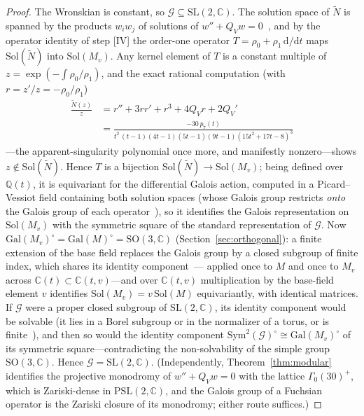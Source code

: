 \documentclass[11pt]{article}
\newcommand{\rmd}{\mathrm{d}}
\theoremstyle{plain}
\theoremstyle{remark}
\begin{document}
\begin{proof}
The Wronskian is constant, so $\mathcal{G}\subseteq\mathrm{SL}(2,\mathbb{C})$.
The solution space of $\widetilde N$ is spanned by the products $w_iw_j$ of solutions of
$w''+Q_Vw=0$~\cite{vdPutSinger}, and by the operator identity of step [IV] the order-one
operator $T=\rho_0+\rho_1\,\rmd/\rmd t$ maps $\mathrm{Sol}(\widetilde N)$ into
$\mathrm{Sol}(M_v)$. Any kernel element of $T$ is a constant multiple of
$z=\exp(-\!\int\!\rho_0/\rho_1)$, and the exact rational computation (with
$r=z'/z=-\rho_0/\rho_1$)
\begin{equation}
\begin{split}
\frac{\widetilde N(z)}{z}&=r''+3rr'+r^3+4Q_Vr+2Q_V'\\[2pt]
&=\frac{-30\,p_7(t)}{t^2\,(t-1)(4t-1)(5t-1)(9t-1)(15t^2+17t-8)^3}
\end{split}
\label{eq:Einj}
\end{equation}
---the apparent-singularity polynomial once more, and manifestly nonzero---shows
$z\notin\mathrm{Sol}(\widetilde N)$. Hence $T$ is a bijection
$\mathrm{Sol}(\widetilde N)\to\mathrm{Sol}(M_v)$; being defined over $\mathbb{Q}(t)$, it is
equivariant for the differential Galois action, computed in a Picard--Vessiot field containing
both solution spaces (whose Galois group restricts \emph{onto} the Galois group of each
operator~\cite{vdPutSinger}), so it identifies the Galois representation on
$\mathrm{Sol}(M_v)$ with the symmetric square of the standard representation of $\mathcal{G}$.
Now $\mathrm{Gal}(M_v)^\circ=\mathrm{Gal}(M)^\circ=\mathrm{SO}(3,\mathbb{C})$
(Section~\ref{sec:orthogonal}): a finite extension of the base field replaces the Galois group by
a closed subgroup of finite index, which shares its identity component~\cite{vdPutSinger}---
applied once to $M$ and once to $M_v$ across $\mathbb{C}(t)\subset\mathbb{C}(t,v)$---and over
$\mathbb{C}(t,v)$ multiplication by the base-field element $v$ identifies
$\mathrm{Sol}(M_v)=v\,\mathrm{Sol}(M)$ equivariantly, with identical matrices. If $\mathcal{G}$ were a
proper closed subgroup of $\mathrm{SL}(2,\mathbb{C})$, its identity component would be
solvable (it lies in a Borel subgroup or in the normalizer of a torus, or is
finite~\cite{Kovacic1986,vdPutSinger}), and then so would the identity component
$\mathrm{Sym}^2(\mathcal{G})^\circ\cong\mathrm{Gal}(M_v)^\circ$ of its symmetric
square---contradicting the non-solvability of the simple group $\mathrm{SO}(3,\mathbb{C})$.
Hence $\mathcal{G}=\mathrm{SL}(2,\mathbb{C})$. (Independently,
Theorem~\ref{thm:modular} identifies the projective monodromy of $w''+Q_Vw=0$ with the lattice
$\Gamma_0(30)^+$, which is Zariski-dense in $\mathrm{PSL}(2,\mathbb{C})$, and the Galois group
of a Fuchsian operator is the Zariski closure of its monodromy; either route suffices.)
\end{proof}
\end{document}
